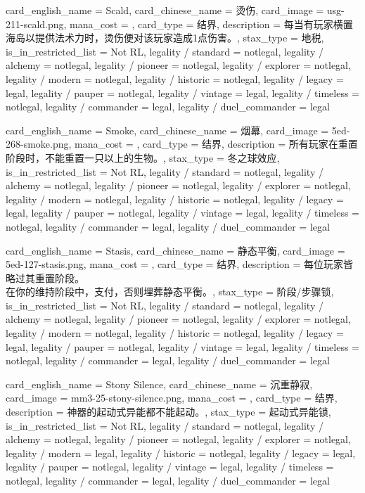 \documentclass[lang = cn, color = black, 10pt]{AllThatStax}
\begin{document}
\card
{
	card_english_name = {Scald},
	card_chinese_name = {烫伤},
	card_image = usg-211-scald.png,
	mana_cost = ,
	card_type = 结界,
	description = {每当有玩家横置海岛以提供法术力时，烫伤便对该玩家造成1点伤害。},
	stax_type = 地税,
	is_in_restricted_list = Not RL,
	legality / standard = notlegal,
	legality / alchemy = notlegal,
	legality / pioneer = notlegal,
	legality / explorer = notlegal,
	legality / modern = notlegal,
	legality / historic = notlegal,
	legality / legacy = legal,
	legality / pauper = notlegal,
	legality / vintage = legal,
	legality / timeless = notlegal,
	legality / commander = legal,
	legality / duel_commander = legal
}

\card
{
	card_english_name = {Smoke},
	card_chinese_name = {烟幕},
	card_image = 5ed-268-smoke.png,
	mana_cost = ,
	card_type = 结界,
	description = {所有玩家在重置阶段时，不能重置一只以上的生物。},
	stax_type = 冬之球效应,
	is_in_restricted_list = Not RL,
	legality / standard = notlegal,
	legality / alchemy = notlegal,
	legality / pioneer = notlegal,
	legality / explorer = notlegal,
	legality / modern = notlegal,
	legality / historic = notlegal,
	legality / legacy = legal,
	legality / pauper = notlegal,
	legality / vintage = legal,
	legality / timeless = notlegal,
	legality / commander = legal,
	legality / duel_commander = legal
}

\card
{
	card_english_name = {Stasis},
	card_chinese_name = {静态平衡},
	card_image = 5ed-127-stasis.png,
	mana_cost = ,
	card_type = 结界,
	description = {每位玩家皆略过其重置阶段。\\
在你的维持阶段中，支付，否则埋葬静态平衡。},
	stax_type = 阶段/步骤锁,
	is_in_restricted_list = Not RL,
	legality / standard = notlegal,
	legality / alchemy = notlegal,
	legality / pioneer = notlegal,
	legality / explorer = notlegal,
	legality / modern = notlegal,
	legality / historic = notlegal,
	legality / legacy = legal,
	legality / pauper = notlegal,
	legality / vintage = legal,
	legality / timeless = notlegal,
	legality / commander = legal,
	legality / duel_commander = legal
}

\card
{
	card_english_name = {Stony Silence},
	card_chinese_name = {沉重静寂},
	card_image = mm3-25-stony-silence.png,
	mana_cost = ,
	card_type = 结界,
	description = {神器的起动式异能都不能起动。},
	stax_type = 起动式异能锁,
	is_in_restricted_list = Not RL,
	legality / standard = notlegal,
	legality / alchemy = notlegal,
	legality / pioneer = notlegal,
	legality / explorer = notlegal,
	legality / modern = legal,
	legality / historic = notlegal,
	legality / legacy = legal,
	legality / pauper = notlegal,
	legality / vintage = legal,
	legality / timeless = notlegal,
	legality / commander = legal,
	legality / duel_commander = legal
}
\end{document}
